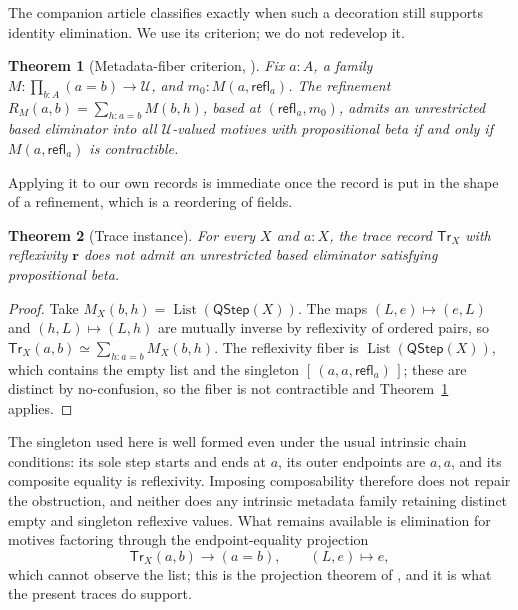 \documentclass[10pt,reqno]{amsart}
\newtheorem{theorem}{Theorem}[section]
\newcommand{\Tr}{\mathsf{Tr}}
\begin{document}
The companion article \cite{ObservableMetadata2026} classifies exactly when such
a decoration still supports identity elimination.  We use its criterion; we do
not redevelop it.

\begin{theorem}[Metadata-fiber criterion, {\cite{ObservableMetadata2026}}]
\label{thm:metadata-fiber-criterion}
Fix \(a:A\), a family \(M:\prod_{b:A}(a=b)\to\mathcal U\), and
\(m_0:M(a,\mathsf{refl}_a)\).  The refinement
\(R_M(a,b)=\sum_{h:a=b}M(b,h)\), based at \((\mathsf{refl}_a,m_0)\), admits an
unrestricted based eliminator into all \(\mathcal U\)-valued motives with
propositional beta if and only if \(M(a,\mathsf{refl}_a)\) is contractible.
\end{theorem}

Applying it to our own records is immediate once the record is put in the shape
of a refinement, which is a reordering of fields.

\begin{theorem}[Trace instance]
\label{thm:no-trace-j}
For every \(X\) and \(a:X\), the trace record \(\Tr_X\) with reflexivity
\(\mathbf r\) does not admit an unrestricted based eliminator satisfying
propositional beta.
\end{theorem}

\begin{proof}
Take \(M_X(b,h)=\operatorname{List}(\mathsf{QStep}(X))\).  The maps
\((L,e)\mapsto(e,L)\) and \((h,L)\mapsto(L,h)\) are mutually inverse by
reflexivity of ordered pairs, so \(\Tr_X(a,b)\simeq\sum_{h:a=b}M_X(b,h)\).  The
reflexivity fiber is \(\operatorname{List}(\mathsf{QStep}(X))\), which contains
the empty list and the singleton
\([\,(a,a,\mathsf{refl}_a)\,]\); these are distinct by no-confusion, so the fiber is not
contractible and Theorem~\ref{thm:metadata-fiber-criterion} applies.
\end{proof}

The singleton used here is well formed even under the usual intrinsic chain
conditions: its sole step starts and ends at \(a\), its outer endpoints are
\(a,a\), and its composite equality is reflexivity.  Imposing composability
therefore does not repair the obstruction, and neither does any intrinsic
metadata family retaining distinct empty and singleton reflexive values.  What
remains available is elimination for motives factoring through the
endpoint-equality projection
\[
 \Tr_X(a,b)\longrightarrow(a=b),\qquad (L,e)\longmapsto e,
\tag{11.1}\label{eq:forget-trace}
\]
which cannot observe the list; this is the projection theorem of
\cite{ObservableMetadata2026}, and it is what the present traces do support.
\end{document}
